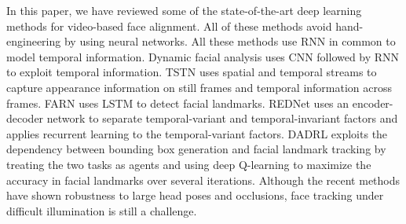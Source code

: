 \documentclass{llncs}
\begin{document}
	In this paper, we have reviewed some of the state-of-the-art deep learning methods for video-based face alignment. All of these methods avoid hand-engineering by using neural networks. All these methods use RNN in common to model temporal information. Dynamic facial analysis\cite{dynamic_facial_analysis} uses CNN followed by RNN to exploit temporal information. TSTN\cite{tstn} uses spatial and temporal streams to capture appearance information on still frames and temporal information across frames. FARN\cite{farn} uses LSTM to detect facial landmarks. REDNet\cite{rednet} uses an encoder-decoder network to separate temporal-variant and temporal-invariant factors and applies recurrent learning to the temporal-variant factors. DADRL \cite{dadrl} exploits the dependency between bounding box generation and facial landmark tracking by treating the two tasks as agents and using deep Q-learning to maximize the accuracy in facial landmarks over several iterations. Although the recent methods have shown robustness to large head poses and occlusions, face tracking under difficult illumination is still a challenge.
	
	\vspace{-3mm}
	
	
	
	
\end{document}

